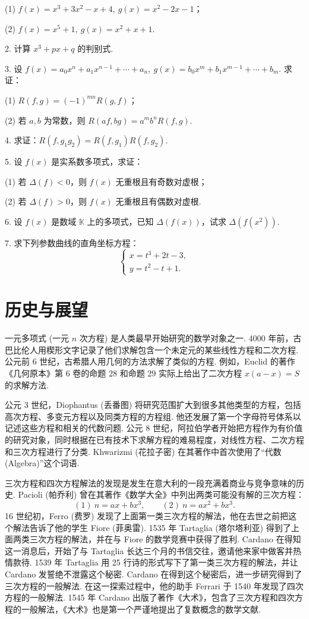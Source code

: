 \documentclass[UTF8, 12pt, fontset=fandol, oneside]{ctexart}
\begin{document}
(1) $f(x)=x^3+3x^2-x+4,\ g(x)=x^2-2x-1$；

(2) $f(x)=x^5+1,\ g(x)=x^2+x+1$.

2. 计算 $x^3+px+q$ 的判别式.

3. 设 $f(x)=a_0x^n+a_1x^{n-1}+\cdots+a_n,\ g(x)=b_0x^m+b_1x^{m-1}+\cdots+b_m$. 求证：

(1) $R(f,g)=(-1)^{mn}R(g,f)$；

(2) 若 $a,b$ 为常数，则 $R(af,bg)=a^mb^nR(f,g)$.

4. 求证：$R(f,g_1g_2)=R(f,g_1)R(f,g_2)$.

5. 设 $f(x)$ 是实系数多项式，求证：

(1) 若 $\Delta(f)<0$，则 $f(x)$ 无重根且有奇数对虚根；

(2) 若 $\Delta(f)>0$，则 $f(x)$ 无重根且有偶数对虚根.

6. 设 $f(x)$ 是数域 $\mathbb{K}$ 上的多项式，已知 $\Delta(f(x))$，试求 $\Delta(f(x^2))$.

7. 求下列参数曲线的直角坐标方程：
\[
\begin{cases}
x=t^3+2t-3,\\
y=t^2-t+1.
\end{cases}
\]

\section*{历史与展望}

一元多项式 (一元 $n$ 次方程) 是人类最早开始研究的数学对象之一. 4000 年前，古巴比伦人用楔形文字记录了他们求解包含一个未定元的某些线性方程和二次方程. 公元前 6 世纪，古希腊人用几何的方法求解了类似的方程. 例如，Euclid 的著作《几何原本》第 6 卷的命题 28 和命题 29 实际上给出了二次方程 $x(a-x)=S$ 的求解方法.

公元 3 世纪，Diophantus (丢番图) 将研究范围扩大到很多其他类型的方程，包括高次方程、多变元方程以及同类方程的方程组. 他还发展了第一个字母符号体系以记述这些方程和相关的代数问题. 公元 8 世纪，阿拉伯学者开始把方程作为有价值的研究对象，同时根据在已有技术下求解方程的难易程度，对线性方程、二次方程和三次方程进行了分类. Khwarizmi (花拉子密) 在其著作中首次使用了“代数 (Algebra)”这个词语.

三次方程和四次方程解法的发现是发生在意大利的一段充满着商业与竞争意味的历史. Pacioli (帕乔利) 曾在其著作《数学大全》中列出两类可能没有解的三次方程：
\[
(1)\ n=ax+bx^3,\qquad (2)\ n=ax^2+bx^3.
\]
16 世纪初，Ferro (费罗) 发现了上面第一类三次方程的解法，他在去世之前把这个解法告诉了他的学生 Fiore (菲奥雷). 1535 年 Tartaglia (塔尔塔利亚) 得到了上面两类三次方程的解法，并在与 Fiore 的数学竞赛中获得了胜利. Cardano 在得知这一消息后，开始了与 Tartaglia 长达三个月的书信交往，邀请他来家中做客并热情款待. 1539 年 Tartaglia 用 25 行诗的形式写下了第一类三次方程的解法，并让 Cardano 发誓绝不泄露这个秘密. Cardano 在得到这个秘密后，进一步研究得到了三次方程的一般解法. 在这一探索过程中，他的助手 Ferrari 于 1540 年发现了四次方程的一般解法. 1545 年 Cardano 出版了著作《大术》，包含了三次方程和四次方程的一般解法，《大术》也是第一个严谨地提出了复数概念的数学文献.
\end{document}
